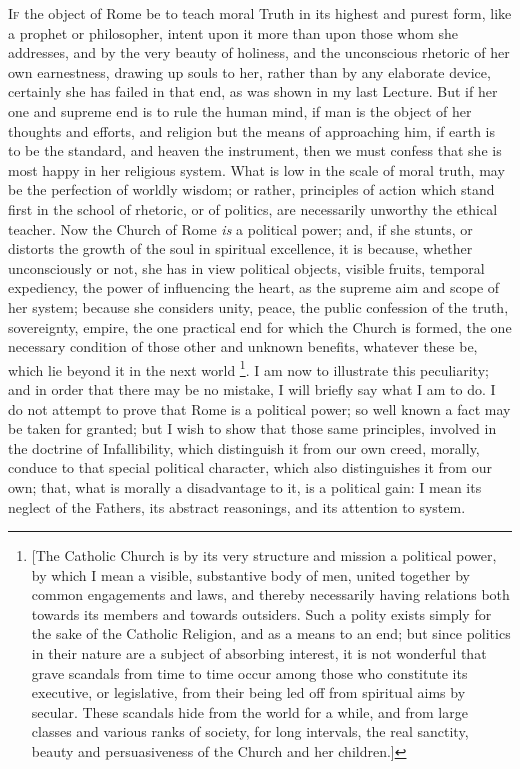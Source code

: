 I\textsc{f} the object of Rome be to teach moral Truth in its highest
and purest form, like a prophet or philosopher, intent upon it more
than upon those whom she addresses, and by the very beauty of
holiness, and the unconscious rhetoric of her own earnestness, drawing
up souls to her, rather than by any elaborate device, certainly she
has failed in that end, as was shown in my last Lecture. But if her
one and supreme end is to rule the human mind, if man is the object of
her thoughts and efforts, and religion but the means of approaching
him, if earth is to be the standard, and heaven the instrument, then
we must confess that she is most happy in her religious system. What
is low in the scale of moral truth, may be the perfection of worldly
wisdom; or rather, principles of action which stand first in the
school of rhetoric, or of politics, are necessarily unworthy the
ethical teacher. Now the Church of Rome \emph{is} a political power;
and, if she stunts, or distorts the growth of the soul in spiritual
excellence, it is because, whether unconsciously or not, she has in
view political objects, visible fruits, temporal expediency, the power
of influencing the heart, as the supreme aim and scope of her system;
because she considers unity, peace, the public confession of the
truth, sovereignty, empire, the one practical end for which the Church
is formed, the one necessary condition of those other and
unknown benefits, whatever these be, which lie beyond it in the next
world \footnote{[The Catholic Church is by its very structure and mission a
political power, by which I mean a visible, substantive body of men,
united together by common engagements and laws, and thereby
necessarily having relations both towards its members and
towards outsiders. Such a polity exists simply for the sake of the
Catholic Religion, and as a means to an end; but since politics in
their nature are a subject of absorbing interest, it is not wonderful
that grave scandals from time to time occur among those who constitute
its executive, or legislative, from their being led off from spiritual
aims by secular. These scandals hide from the world for a while, and
from large classes and various ranks of society, for long intervals,
the real sanctity, beauty and persuasiveness of the Church and her
children.]}. I am now to
illustrate this peculiarity; and in order that there may be no
mistake, I will briefly say what I am to do. I do not attempt to prove
that Rome is a political power; so well known a fact may be taken for
granted; but I wish to show that those same principles, involved in
the doctrine of Infallibility, which distinguish it from our own
creed, morally, conduce to that special political character, which
also distinguishes it from our own; that, what is morally a
disadvantage to it, is a political gain: I mean its neglect of the
Fathers, its abstract reasonings, and its attention to system.

